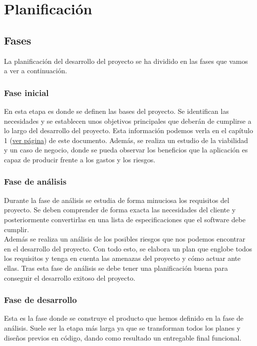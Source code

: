 \chapter{Planificación}
\label{chap:planification}


\section{Fases}

La planificación del desarrollo del proyecto se ha dividido en las fases que vamos a ver a continuación.

\subsection{Fase inicial}

En esta etapa es donde se definen las bases del proyecto. Se identifican las necesidades y se establecen unos objetivos principales que deberán de cumplirse a lo largo del desarrollo del proyecto. Esta información podemos verla en el capítulo 1 (\hyperref[chap:introduction]{ver página}) de este documento. Además, se realiza un estudio de la viabilidad y un caso de negocio, donde se pueda observar los beneficios que la aplicación es capaz de producir frente a los gastos y los riesgos. 

\subsection{Fase de análisis}

Durante la fase de análisis se estudia de forma minuciosa los requisitos del proyecto. Se deben comprender de forma exacta las necesidades del cliente y posteriormente convertirlas en una lista de especificaciones que el software debe cumplir. \\ 

Además se realiza un análisis de los posibles riesgos que nos podemos encontrar en el desarrollo del proyecto. Con todo esto, se elabora un plan que englobe todos los requisitos y tenga en cuenta las amenazas del proyecto y cómo actuar ante ellas. Tras esta fase de análisis se debe tener una planificación buena para conseguir el desarrollo exitoso del proyecto. 


\subsection{Fase de desarrollo}

Esta es la fase donde se construye el producto que hemos definido en la fase de análisis. Suele ser la etapa más larga ya que se transforman todos los planes y diseños previos en código, dando como resultado un entregable final funcional.\\


